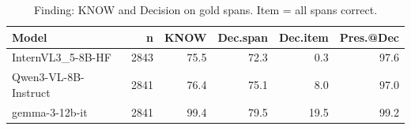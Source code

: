 \begin{table}[t]\centering\small
\caption{Finding: KNOW and Decision on gold spans. Item = all spans correct.}
\label{tab:news-decision}
\begin{tabular}{l r r r r r}\toprule
Model & n & KNOW & Dec.span & Dec.item & Pres.@Dec \\
\midrule
InternVL3_5-8B-HF & 2843 & 75.5 & 72.3 & 0.3 & 97.6 \\
Qwen3-VL-8B-Instruct & 2841 & 76.4 & 75.1 & 8.0 & 97.0 \\
gemma-3-12b-it & 2841 & 99.4 & 79.5 & 19.5 & 99.2 \\
\bottomrule\end{tabular}\end{table}
